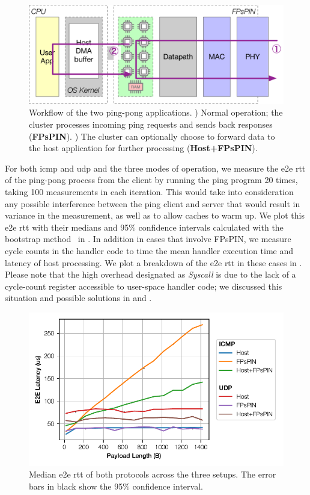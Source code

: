 \begin{figure}
    \centering
    \includegraphics[width=.8\textwidth]{figures/demo-apps.pdf}
    \caption[Workflow of the ping-pong demo]{Workflow of the two ping-pong applications.  ) Normal operation; the cluster processes incoming ping requests and sends back responses (\textbf{FPsPIN}).  ) The cluster can optionally choose to forward data to the host application for further processing (\textbf{Host+FPsPIN}).} \label{fig:demo-pingpong}
\end{figure}

For both \ac{icmp} and \ac{udp} and the three modes of operation, we measure the \ac{e2e} \ac{rtt} of the ping-pong process from the client by running the ping program 20 times, taking 100 measurements in each iteration.  This would take into consideration any possible interference between the ping client and server that would result in variance in the measurement, as well as to allow caches to warm up.  We plot this \ac{e2e} \ac{rtt} with their medians and 95\% confidence intervals calculated with the bootstrap method~\cite{diciccio_bootstrap_1996} in .  In addition in cases that involve FPsPIN, we measure cycle counts in the handler code to time the mean handler execution time and latency of host processing.  We plot a breakdown of the \ac{e2e} \ac{rtt} in these cases in .  Please note that the high overhead designated as \emph{Syscall} is due to the lack of a cycle-count register accessible to user-space handler code; we discussed this situation and possible solutions in  and .

\begin{figure}[tp]
    \centering
    \includegraphics{thesis/figures/pingpong-lat.pdf}
    \caption{Median \ac{e2e} \ac{rtt} of both protocols across the three setups.  The error bars in black show the 95\% confidence interval.} \label{fig:pingpong-lat}
\end{figure}

